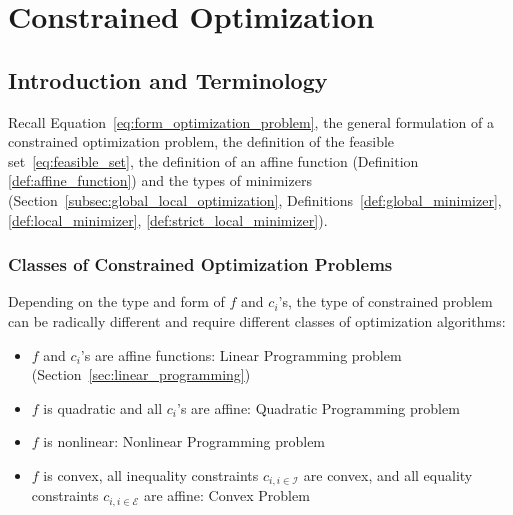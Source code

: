 \documentclass[9pt, headings=standardclasses, parskip=half]{scrartcl}
\renewcommand{\emph}[1]{\textcolor{mypurple}{#1}}
\newcommand{\vect}[1]{\vec{\boldsymbol{#1}}}
\begin{document}
\clearpage
\section{Constrained Optimization}\label{sec:constrained_optimization}
\subsection{Introduction and Terminology}\label{sec:intro_constrained_optimization}
Recall Equation~\eqref{eq:form_optimization_problem}, the general formulation of a constrained optimization problem, the definition of the feasible set~\eqref{eq:feasible_set}, the definition of an affine function (Definition \ref{def:affine_function}) and the types of minimizers (Section~\ref{subsec:global_local_optimization}, Definitions~\ref{def:global_minimizer}, \ref{def:local_minimizer}, \ref{def:strict_local_minimizer}).

\subsubsection{Classes of Constrained Optimization Problems}
Depending on the type and form of $f$ and $c_i$'s, the type of constrained problem can be radically different and require different classes of optimization algorithms:
\begin{itemize}
  \item $f$ and $c_i$'s are \emph{affine} functions: Linear Programming problem (Section~\ref{sec:linear_programming})
  \item $f$ is \emph{quadratic} and all $c_i$'s are \emph{affine}: Quadratic Programming problem
  \item $f$ is \emph{nonlinear}: Nonlinear Programming problem
  \item $f$ is \emph{convex}, all inequality constraints $c_{i,i\in\mathcal{I}}$ are \emph{convex}, and all equality constraints $c_{i,i\in\mathcal{E}}$ are \emph{affine}: Convex Problem
\end{itemize}
\end{document}
